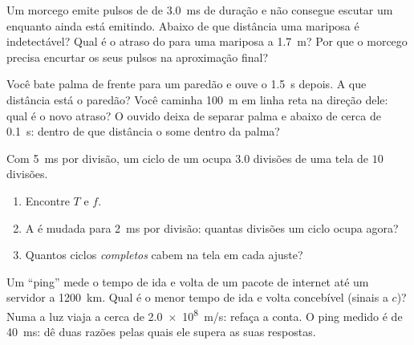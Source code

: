 \begin{exercise}[$\star\star\star$]\label{exo:g10:signals-and-waves:12}
Um morcego emite pulsos de  de \qty{3.0}{ms} de duração e não
consegue escutar um  enquanto ainda está emitindo. Abaixo de que
distância uma mariposa é indetectável? Qual é o atraso do  para uma
mariposa a \qty{1.7}{m}? Por que o morcego precisa encurtar os seus
pulsos na aproximação final?
\end{exercise}

\begin{exercise}[$\star\star\star$]\label{exo:g10:signals-and-waves:13}
Você bate palma de frente para um paredão e ouve o  \qty{1.5}{s}
depois. A que distância está o paredão? Você caminha \qty{100}{m} em
linha reta na direção dele: qual é o novo atraso? O ouvido deixa de
separar palma e  abaixo de cerca de \qty{0.1}{s}: dentro de que
distância o  some dentro da palma?
\end{exercise}

\begin{exercise}[$\star\star\star$]\label{exo:g10:signals-and-waves:14}
Com \qty{5}{ms} por divisão, um ciclo de um  ocupa $3.0$ divisões de
uma tela de $10$ divisões.
\begin{enumerate}
  \item Encontre $T$ e $f$.
  \item A  é mudada para \qty{2}{ms} por divisão: quantas
        divisões um ciclo ocupa agora?
  \item Quantos ciclos \emph{completos} cabem na tela em cada ajuste?
\end{enumerate}
\end{exercise}

\begin{exercise}[$\star\star\star$]\label{exo:g10:signals-and-waves:15}
Um ``ping'' mede o tempo de ida e volta de um pacote de internet até um
servidor a \qty{1200}{km}. Qual é o menor tempo de ida e volta
concebível (sinais a $c$)? Numa  a luz viaja a cerca de
\qty{2.0e8}{m/s}: refaça a conta. O ping medido é de \qty{40}{ms}: dê
duas razões pelas quais ele supera as suas respostas.
\end{exercise}

